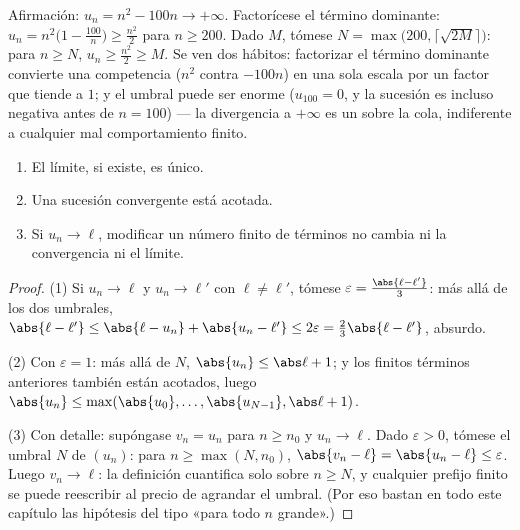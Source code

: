 \begin{example}\label{ex:b1:seq:toinfinity}
Afirmación: $u_n = n^2 - 100n \to +\infty$. Factorícese el término
dominante: $u_n = n^2\bigl(1 - \frac{100}{n}\bigr) \geq \frac{n^2}{2}$
para $n \geq 200$. Dado $M$, tómese $N = \max\bigl(200,
\lceil\sqrt{2M}\rceil\bigr)$: para $n \geq N$,
$u_n \geq \frac{n^2}{2} \geq M$. Se ven dos hábitos: factorizar el
término dominante convierte una competencia ($n^2$ contra $-100n$) en
una sola escala por un factor que tiende a $1$; y el umbral puede ser
enorme ($u_{100} = 0$, y la sucesión es incluso negativa antes de
$n = 100$) --- la divergencia a $+\infty$ es un  sobre la
cola, indiferente a cualquier mal comportamiento finito.
\end{example}

\begin{proposition}\label{prop:b1:seq:first}
\begin{enumerate}
  \item El límite, si existe, es único.
  \item Una sucesión convergente está acotada.
  \item Si $u_n \to \ell$, modificar un número finito de términos no
        cambia ni la convergencia ni el límite.
\end{enumerate}
\end{proposition}

\begin{proof}
(1) Si $u_n \to \ell$ y $u_n \to \ell'$ con $\ell \neq \ell'$, tómese
$\varepsilon = \frac{\abs{\ell - \ell'}}{3}$: más allá de los dos
umbrales, $\abs{\ell - \ell'} \leq \abs{\ell - u_n} + \abs{u_n -
\ell'} \leq 2\varepsilon = \frac23 \abs{\ell - \ell'}$, absurdo.

(2) Con $\varepsilon = 1$: más allá de $N$,
$\abs{u_n} \leq \abs\ell + 1$; y los finitos términos anteriores
también están acotados, luego $\abs{u_n} \leq \max(\abs{u_0}, \dots,
\abs{u_{N-1}}, \abs\ell + 1)$.

(3) Con detalle: supóngase $v_n = u_n$ para $n \geq n_0$ y
$u_n \to \ell$. Dado $\varepsilon > 0$, tómese el umbral $N$ de
$(u_n)$: para $n \geq \max(N, n_0)$, $\abs{v_n - \ell} = \abs{u_n -
\ell} \leq \varepsilon$. Luego $v_n \to \ell$: la definición
cuantifica solo sobre $n \geq N$, y cualquier prefijo finito se puede
reescribir al precio de agrandar el umbral. (Por eso bastan en todo
este capítulo las hipótesis del tipo «para todo $n$ grande».)
\end{proof}

